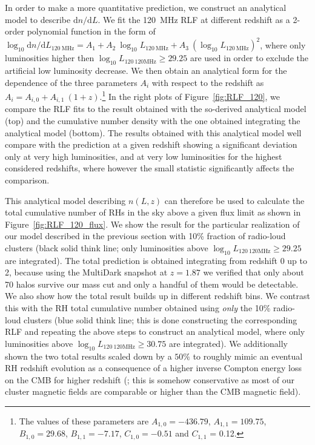 \documentclass[traditabstract]{aa}
\newcommand{\rmn}{\mathrm}
\begin{document}
In order to make a more quantitative prediction, we construct an analytical model to describe $\rmn{d}n/\rmn{d}L$. We fit the 120~MHz RLF at different redshift as a 2-order polynomial function in the form of $\log_{10} \rmn{d}n/\rmn{d}L_{120~\rmn{MHz}} = A_{1} + A_{2}~\log_{10} L_{120~\rmn{MHz}} + A_{3}~(\log_{10} L_{120~\rmn{MHz}})^{2}$, where only luminosities higher then $\log_{10} L_{120~\rmn{120MHz}} \geq 29.25$ are used in order to exclude the artificial low luminosity decrease. We then obtain an analytical form for the dependence of the three parameters $A_{i}$ with respect to the redshift as $A_{i} = A_{i,0} + A_{i,1}~(1+z)$.\footnote[15]{The values of these parameters are $A_{1,0} = -436.79$, $A_{1,1} = 109.75$, $B_{1,0} = 29.68$, $B_{1,1} = -7.17$, $C_{1,0} = -0.51$ and $C_{1,1}$ = 0.12.} In the right plots of Figure~\ref{fig:RLF_120}, we compare the RLF fits to the result obtained with the so-derived analytical model (top) and the cumulative number density with the one obtained integrating the analytical model (bottom). The results obtained with this analytical model well compare with the prediction at a given redshift showing a significant deviation only at very high luminosities, and at very low luminosities for the highest considered redshifts, where however the small statistic significantly affects the comparison. 

This analytical model describing $n(L,z)$ can therefore be used to calculate the total cumulative number of RHs in the sky above a given flux limit as shown in Figure~\ref{fig:RLF_120_flux}. We show the result for the particular realization of our model described in the previous section with 10\% fraction of radio-loud clusters (black solid think line; only luminosities above $\log_{10} L_{120~\rmn{120MHz}} \geq 29.25$ are integrated). The total prediction is obtained integrating from redshift 0 up to 2, because using the MultiDark snapshot at $z = 1.87$ we verified that only about 70 halos survive our mass cut and only a handful of them would be detectable. We also show how the total result builds up in different redshift bins. We contrast this with the RH total cumulative number obtained using \emph{only} the 10\% radio-loud clusters (blue solid think line; this is done constructing the corresponding RLF and repeating the above steps to construct an analytical model, where only luminosities above $\log_{10} L_{120~\rmn{120MHz}} \geq 30.75$ are integrated). We additionally shown the two total results scaled down by a $50\%$ to roughly mimic an eventual RH redshift evolution as a consequence of a higher inverse Compton energy loss on the CMB for higher redshift (\citealp{2002A&A...396...83E}; this is somehow conservative as most of our cluster magnetic fields are comparable or higher than the CMB magnetic field). 
\end{document}
